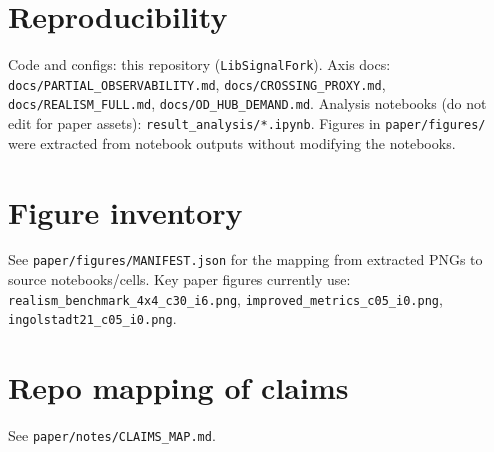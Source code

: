 \documentclass[11pt,a4paper]{article}
\newcommand{\repo}{\texttt{LibSignalFork}}
\begin{document}
\section*{Reproducibility}
Code and configs: this repository (\repo).
Axis docs: \texttt{docs/PARTIAL\_OBSERVABILITY.md}, \texttt{docs/CROSSING\_PROXY.md}, \texttt{docs/REALISM\_FULL.md}, \texttt{docs/OD\_HUB\_DEMAND.md}.
Analysis notebooks (do not edit for paper assets): \texttt{result\_analysis/*.ipynb}.
Figures in \texttt{paper/figures/} were extracted from notebook outputs without modifying the notebooks.




\appendix
\section{Figure inventory}
\label{app:figs}
See \texttt{paper/figures/MANIFEST.json} for the mapping from extracted PNGs to source notebooks/cells.
Key paper figures currently use:
\texttt{realism\_benchmark\_4x4\_c30\_i6.png},
\texttt{improved\_metrics\_c05\_i0.png},
\texttt{ingolstadt21\_c05\_i0.png}.

\section{Repo mapping of claims}
\label{app:claims}
See \texttt{paper/notes/CLAIMS\_MAP.md}.
\end{document}

